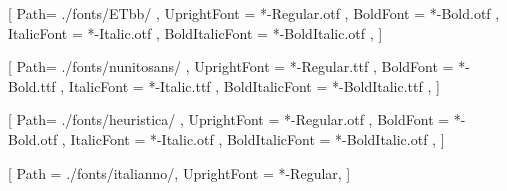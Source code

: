 \usepackage{lipsum}
\usepackage{blindtext}

\usepackage{microtype}
\usepackage[]{fontspec}

\setmainfont{etbb}[%
	Path= ./fonts/ETbb/ ,
	UprightFont		= *-Regular.otf ,
	BoldFont		= *-Bold.otf ,
	ItalicFont      = *-Italic.otf ,
	BoldItalicFont  = *-BoldItalic.otf ,
]

\setsansfont{NunitoSans}[%
	Path= ./fonts/nunitosans/ ,
	UprightFont		= *-Regular.ttf ,
	BoldFont		= *-Bold.ttf ,
	ItalicFont      = *-Italic.ttf ,
	BoldItalicFont  = *-BoldItalic.ttf ,
]

\setmonofont{Heuristica}[%
	Path= ./fonts/heuristica/ ,
	UprightFont		= *-Regular.otf ,
	BoldFont		= *-Bold.otf ,
	ItalicFont      = *-Italic.otf ,
	BoldItalicFont  = *-BoldItalic.otf ,
]

\newfontfamily{}[%
	Path            =   ./fonts/italianno/,
	UprightFont     =   *-Regular,
] 

%
%
\setstocksize{8in}{5in} %
\settrimmedsize{\stockheight}{\stockwidth}{*}

\checkandfixthelayout




\pagestyle{mypagestyle}		

%	
%

